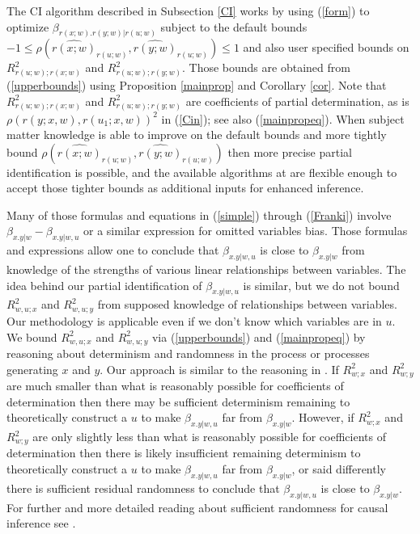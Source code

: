 \documentclass[11pt]{amsart}
\begin{document}
The CI algorithm described in Subsection \ref{CI} works by using (\ref{form}) to optimize $\beta_{r(x;w).r(y;w)|r(u;w)}$ subject to the default bounds $-1\leq\rho\left(\hat{r(x;w)}_{r(u;w)},\hat{r(y;w)}_{r(u;w)}\right)\leq1$ and also user specified bounds on $R^2_{r(u;w);r(x;w)}$ and $R^2_{r(u;w);r(y;w)}$. Those bounds are obtained from (\ref{upperbounds}) using Proposition \ref{mainprop} and Corollary \ref{cor}. Note that $R^2_{r(u;w);r(x;w)}$ and $R^2_{r(u;w);r(y;w)}$ are coefficients of partial determination, as is $\rho(r(y;x,w),r(u_1;x,w))^2$ in (\ref{Cin}); see also (\ref{mainpropeq}). When subject matter knowledge is able to improve on the default bounds and more tightly bound $\rho\left(\hat{r(x;w)}_{r(u;w)},\hat{r(y;w)}_{r(u;w)}\right)$ then more precise partial identification is possible, and the available algorithms at \citep{Hughes25} are flexible enough to accept those tighter bounds as additional inputs for enhanced inference. 

Many of those formulas and equations in (\ref{simple}) through (\ref{Franki}) involve $\beta_{x.y|w}-\beta_{x.y|w,u}$ or a similar expression for omitted variables bias. Those formulas and expressions allow one to conclude that $\beta_{x.y|w,u}$ is close to $\beta_{x.y|w}$ from knowledge of the strengths of various linear relationships between variables. The idea behind our partial identification of $\beta_{x.y|w,u}$ is similar, but we do not bound $R^2_{w,u;x}$ and $R^2_{w,u;y}$ from supposed knowledge of relationships between variables. Our methodology is applicable even if we don't know which variables are in $u$. We bound $R^2_{w,u;x}$ and $R^2_{w,u;y}$ via (\ref{upperbounds}) and (\ref{mainpropeq}) by reasoning about determinism and randomness in the process or processes generating $x$ and $y$. Our approach is similar to the reasoning in \citep{PearlDM}. %
If $R^2_{w;x}$ and $R^2_{w;y}$ are much smaller than what is reasonably possible for coefficients of determination then there may be sufficient determinism remaining to theoretically construct a $u$ to make $\beta_{x.y|w,u}$ far from $\beta_{x.y|w}$. However, if $R^2_{w;x}$ and $R^2_{w;y}$ are only slightly less than what is reasonably possible for coefficients of determination then there is likely insufficient remaining determinism to theoretically construct a $u$ to make $\beta_{x.y|w,u}$ far from $\beta_{x.y|w}$, or said differently there is sufficient residual randomness to conclude that $\beta_{x.y|w,u}$ is close to $\beta_{x.y|w}$. For further and more detailed reading about sufficient randomness for causal inference see \cite{Knaeble2023,Knaeble2024}.
\end{document}
